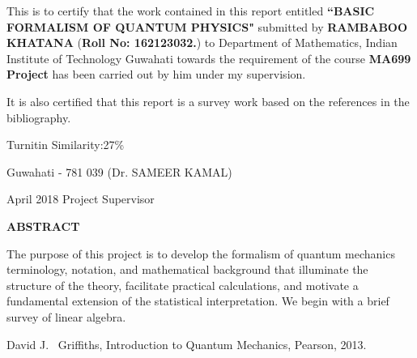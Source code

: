 \documentclass[12pt,a4wide]{report}
\theoremstyle{plain}
\theoremstyle{definition}
\theoremstyle{remark}
\begin{document}
\noindent
This is to certify that the work contained in this report
entitled {\textbf{``BASIC FORMALISM OF QUANTUM PHYSICS"}} submitted by \textbf{RAMBABOO KHATANA}
(\textbf{Roll No: 162123032.}) to Department of Mathematics, Indian Institute of Technology
Guwahati towards the requirement of the course \textbf{MA699 Project}
has been carried out by him under my
supervision.\\
\par
\noindent
It is also certified that this report is a survey work based on the references in the bibliography.\\
\par
\noindent
Turnitin Similarity:27\%
\vspace{4cm}

\noindent Guwahati - 781 039 \hfill (Dr. SAMEER KAMAL)

\noindent April  2018 \hfill Project Supervisor

\clearpage

\begin{center}
{\Large{\bf{ABSTRACT}}}
\end{center}


The purpose of this project is to develop the formalism of quantum mechanics terminology, notation, and mathematical background that illuminate the structure of the theory, facilitate practical calculations, and motivate a fundamental extension of the statistical interpretation. We begin with a brief survey of linear algebra.

\clearpage



\tableofcontents
\clearpage


\newpage

\setcounter{page}{1}







\begin{thebibliography}{10}
David J.~ Griffiths, Introduction to Quantum Mechanics, Pearson, 2013.

\end{thebibliography}
\end{document}
